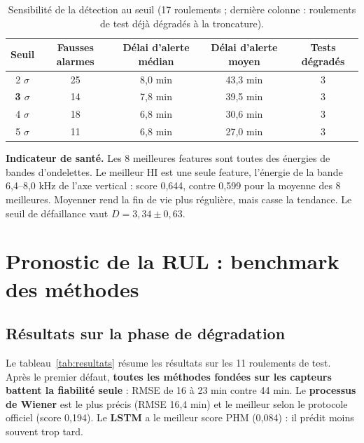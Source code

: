 \begin{table}[H]
\centering\small
\begin{tabular}{ccccc}
\toprule
Seuil & Fausses alarmes & Délai d'alerte médian & Délai d'alerte moyen & Tests dégradés \\
\midrule
2 $\sigma$ & 25 & 8,0 min & 43,3 min & 3 \\
\textbf{3 $\sigma$} & 14 & 7,8 min & 39,5 min & 3 \\
4 $\sigma$ & 18 & 6,8 min & 30,6 min & 3 \\
5 $\sigma$ & 11 & 6,8 min & 27,0 min & 3 \\
\bottomrule
\end{tabular}
\caption[Sensibilité au seuil de détection]{Sensibilité de la détection au seuil (17 roulements ; dernière colonne : roulements de test déjà dégradés à la troncature).}
\label{tab:sensibilite}
\end{table}

\textbf{Indicateur de santé.} Les 8 meilleures features sont toutes des énergies de bandes d'ondelettes. Le meilleur HI est une seule feature, l'énergie de la bande 6,4–8,0 kHz de l'axe vertical : score 0,644, contre 0,599 pour la moyenne des 8 meilleures. Moyenner rend la fin de vie plus régulière, mais casse la tendance. Le seuil de défaillance vaut $D = 3{,}34 \pm 0{,}63$.

\section{Pronostic de la RUL : benchmark des méthodes}

\subsection{Résultats sur la phase de dégradation}
Le tableau~\ref{tab:resultats} résume les résultats sur les 11 roulements de test. Après le premier défaut, \textbf{toutes les méthodes fondées sur les capteurs battent la fiabilité seule} : RMSE de 16 à 23 min contre 44 min. Le \textbf{processus de Wiener} est le plus précis (RMSE 16,4 min) et le meilleur selon le protocole officiel (score 0,194). Le \textbf{LSTM} a le meilleur score PHM (0,084) : il prédit moins souvent trop tard.

